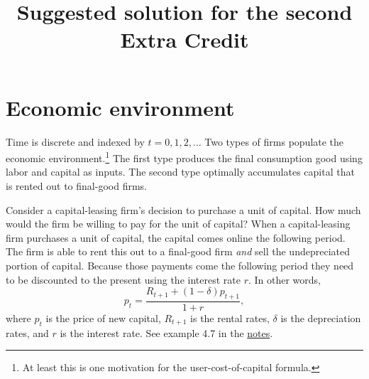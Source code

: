 \documentclass[12pt]{pracjourn_rwr}
\title{Suggested solution for the second Extra Credit}
\theoremstyle{definition}
\theoremstyle{remark}
\begin{document}
\maketitle

\tableofcontents

\section{Economic environment}

Time is discrete and indexed by $t = 0,1,2,\dots$
Two types of firms populate the economic environment.\footnote{At least this is one motivation for the user-cost-of-capital formula.}
The first type produces the final consumption good using labor and capital as inputs.
The second type optimally accumulates capital that is rented out to final-good firms.

Consider a capital-leasing firm's decision to purchase a unit of capital.
How much would the firm be willing to pay for the unit of capital?
When a capital-leasing firm purchases a unit of capital, the capital comes online the following period.
The firm is able to rent this out to a final-good firm \emph{and} sell the undepreciated portion of capital.
Because those payments come the following period they need to be discounted to the present using the interest rate $r$.
In other words,
\begin{equation}
\label{eq:1}
p_{t} = \frac{R_{t+1} + (1-\delta)p_{t+1}}{1+r},
\end{equation}
where $p_{t}$ is the price of new capital, $R_{t+1}$ is the rental rates, $\delta$ is the depreciation rates, and
$r$ is the interest rate.
See example 4.7 in the \href{https://umich.app.box.com/s/dlnc24jda0xu9sqifl2uicc4cdmzit4l}{notes}.
\end{document}
